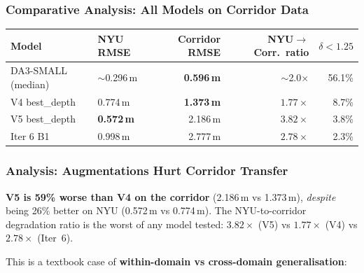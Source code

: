 \documentclass[11pt,a4paper]{article}
\begin{document}
\subsubsection{Comparative Analysis: All Models on Corridor Data}

\begin{longtable}{llrrr}
\toprule
\textbf{Model} & \textbf{NYU RMSE} & \textbf{Corridor RMSE} & \textbf{NYU$\to$Corr.\ ratio} & \textbf{$\delta < 1.25$} \\
\midrule
\endfirsthead
DA3-SMALL (median)       & $\sim$0.296\,m & \textbf{0.596\,m} & $\sim$2.0$\times$ & 56.1\% \\
V4 best\_depth           & 0.774\,m       & \textbf{1.373\,m} & $1.77\times$       &  8.7\% \\
V5 best\_depth           & \textbf{0.572\,m} & 2.186\,m       & $3.82\times$       &  3.8\% \\
Iter 6 B1                & 0.998\,m       & 2.777\,m          & $2.78\times$       &  2.3\% \\
\bottomrule
\end{longtable}

\subsubsection{Analysis: Augmentations Hurt Corridor Transfer}

\textbf{V5 is 59\% worse than V4 on the corridor} (2.186\,m vs 1.373\,m),
\emph{despite} being 26\% better on NYU (0.572\,m vs 0.774\,m). The
NYU-to-corridor degradation ratio is the worst of any model tested:
$3.82\times$ (V5) vs $1.77\times$ (V4) vs $2.78\times$ (Iter~6).

This is a textbook case of \textbf{within-domain vs cross-domain
generalisation}:
\end{document}
